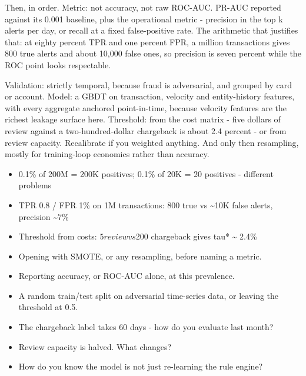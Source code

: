 \documentclass[10pt,twoside]{book}
\newcommand{\lab}[1]{\par\vspace{5pt}\noindent{\sffamily\footnotesize\bfseries\color{accent}#1}\par\vspace{1pt}}
\newcommand{\flab}[1]{\par\vspace{5pt}\noindent{\sffamily\footnotesize\bfseries\color{flag}#1}\par\vspace{1pt}}
\begin{document}
Then, in order. Metric: not accuracy, not raw ROC-AUC. PR-AUC reported against its 0.001 baseline, plus the operational metric - precision in the top k alerts per day, or recall at a fixed false-positive rate. The arithmetic that justifies that: at eighty percent TPR and one percent FPR, a million transactions gives 800 true alerts and about 10,000 false ones, so precision is seven percent while the ROC point looks respectable.\par\vspace{3pt}
Validation: strictly temporal, because fraud is adversarial, and grouped by card or account. Model: a GBDT on transaction, velocity and entity-history features, with every aggregate anchored point-in-time, because velocity features are the richest leakage surface here. Threshold: from the cost matrix - five dollars of review against a two-hundred-dollar chargeback is about 2.4 percent - or from review capacity. Recalibrate if you weighted anything. And only then resampling, mostly for training-loop economics rather than accuracy.\par\vspace{3pt}
\lab{Numbers}
\begin{itemize}
\item 0.1\% of 200M = 200K positives; 0.1\% of 20K = 20 positives - different problems
\item TPR 0.8 / FPR 1\% on 1M transactions: 800 true vs \textasciitilde{}10K false alerts, precision \textasciitilde{}7\%
\item Threshold from costs: $5 review vs $200 chargeback gives tau* \textasciitilde{} 2.4\%
\end{itemize}
\flab{Loses the signal}
\begin{itemize}
\item Opening with SMOTE, or any resampling, before naming a metric.
\item Reporting accuracy, or ROC-AUC alone, at this prevalence.
\item A random train/test split on adversarial time-series data, or leaving the threshold at 0.5.
\end{itemize}
\lab{Then they ask}
\begin{itemize}
\item The chargeback label takes 60 days - how do you evaluate last month?
\item Review capacity is halved. What changes?
\item How do you know the model is not just re-learning the rule engine?
\end{itemize}
\end{document}
